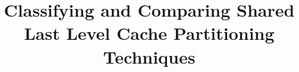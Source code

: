 \documentclass[letter, 10pt]{IEEEtran}
\title{Classifying and Comparing Shared Last Level Cache Partitioning Techniques}
\begin{document}
\maketitle
\thispagestyle{firstpage}
\pagestyle{plain}


\begin{abstract}

\end{abstract}







\end{document}
